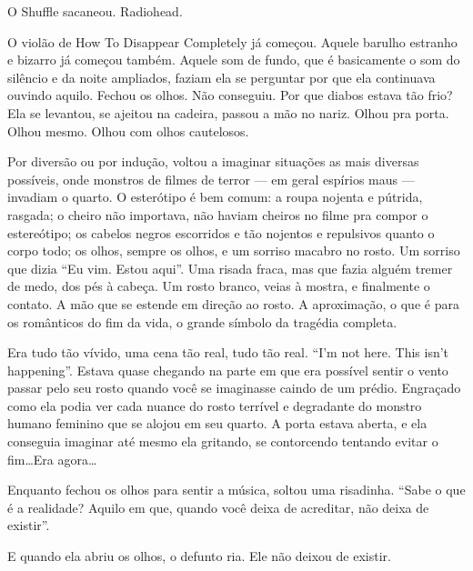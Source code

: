 O Shuffle sacaneou. Radiohead.

O violão de How To Disappear Completely já começou. Aquele barulho estranho e bizarro já começou também. Aquele som de fundo, que é basicamente o som do silêncio e da noite ampliados, faziam ela se perguntar por que ela continuava ouvindo aquilo. Fechou os olhos. Não conseguiu. Por que diabos estava tão frio? Ela se levantou, se ajeitou na cadeira, passou a mão no nariz. Olhou pra porta. Olhou mesmo. Olhou com olhos cautelosos.

Por diversão ou por indução, voltou a imaginar situações as mais diversas possíveis, onde monstros de filmes de terror --- em geral espírios maus --- invadiam o quarto. O esterótipo é bem comum: a roupa nojenta e pútrida, rasgada; o cheiro não importava, não haviam cheiros no filme pra compor o estereótipo; os cabelos negros escorridos e tão nojentos e repulsivos quanto o corpo todo; os olhos, sempre os olhos, e um sorriso macabro no rosto. Um sorriso que dizia ``Eu vim. Estou aqui''. Uma risada fraca, mas que fazia alguém tremer de medo, dos pés à cabeça. Um rosto branco, veias à mostra, e finalmente o contato. A mão que se estende em direção ao rosto. A aproximação, o que é para os românticos do fim da vida, o grande símbolo da tragédia completa.

Era tudo tão vívido, uma cena tão real, tudo tão real. ``I'm not here. This isn’t happening''. Estava quase chegando na parte em que era possível sentir o vento passar pelo seu rosto quando você se imaginasse caindo de um prédio. Engraçado como ela podia ver cada nuance do rosto terrível e degradante do monstro humano feminino que se alojou em seu quarto. A porta estava aberta, e ela conseguia imaginar até mesmo ela gritando, se contorcendo tentando evitar o fim\ldots Era agora\ldots

Enquanto fechou os olhos para sentir a música, soltou uma risadinha. ``Sabe o que é a realidade? Aquilo em que, quando você deixa de acreditar, não deixa de existir''.

E quando ela abriu os olhos, o defunto ria. Ele não deixou de existir.

